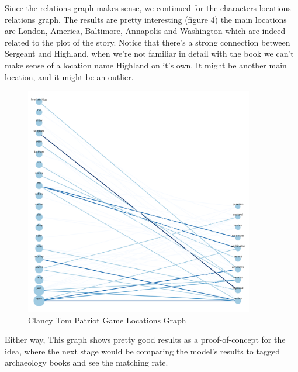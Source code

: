 \documentclass{article}
\begin{document}
Since the relations graph makes sense, we continued for the characters-locations relations graph. The results are pretty interesting (figure 4) the main locations are London, America, Baltimore, Annapolis and Washington which are indeed related to the plot of the story. Notice that there's a strong connection between Sergeant and Highland, when we're not familiar in detail with the book we can't make sense of a location name Highland on it's own. It might be another main location, and it might be an outlier.

\begin{figure}[h]
  \centering
  \includegraphics[width=10cm]{Tom Clancy - Patriot Games locations graph.png}
  \caption{Clancy Tom Patriot Game Locations Graph}
  \label{fig4}
\end{figure}

Either way, This graph shows pretty good results as a proof-of-concept for the idea, where the next stage would be comparing the model's results to tagged archaeology books and see the matching rate.
\end{document}
